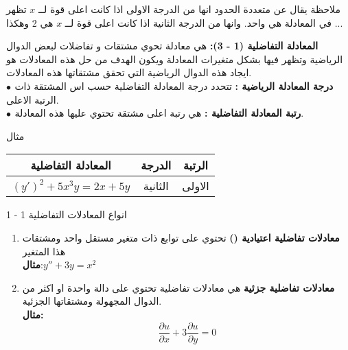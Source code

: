 	\begin{frame}
			\begin{exampleblock}{ملاحظة}
			يقال عن متعددة الحدود انها من الدرجة الاولى اذا كانت اعلى قوة لــ $x$ تظهر في المعادلة هي واحد. وانها من الدرجة الثانية اذا كانت اعلى قوة لــ $x$ هي 2 وهكذا ...
		\end{exampleblock}
		
		\begin{exampleblock}{\textbf{المعادلة التفاضلية (1 - 3):}}
			هي معادلة تحوي مشتقات و تفاضلات لبعض الدوال الرياضية وتظهر فيها بشكل متغيرات المعادلة ويكون الهدف من حل هذه المعادلات هو ايجاد هذه الدوال الرياضية التي تحقق مشتقاتها هذه المعادلات.\\
			\textbf{$\bullet$ درجة المعادلة الرياضية :}
			تتحدد درجة المعادلة التفاضلية حسب اس المشتقة ذات الرتبة الاعلى.\\
			\textbf{$\bullet$ رتبة المعادلة التفاضلية :}
			هي رتبة اعلى مشتقة تحتوي عليها هذه المعادلة.
		\end{exampleblock}
	\end{frame}
	
	\begin{frame}
		\begin{exampleblock}{مثال}
				\begin{table}[H]
				\renewcommand{\arraystretch}{1.4}
				\centering
				\begin{tabular}{|c|c|c|}
					\hline
					\textbf{المعادلة التفاضلية} & \textbf{الدرجة} & \textbf{الرتبة}\\
					\hline
					$(y')^2 + 5x^3 y = 2x + 5y$ & الثانية & الاولى\\
					\hline
				\end{tabular}
			\end{table}
		\end{exampleblock}
		
		\begin{exampleblock}{1 - 1 انواع المعادلات التفاضلية}
			\begin{enumerate}
				\item \textbf{معادلات تفاضلية اعتيادية ()} تحتوي على توابع ذات متغير مستقل واحد ومشتقات هذا المتغير \\
				\textbf{مثال}:\qquad $y'' + 3y = x^2$
				\item \textbf{معادلات تفاضلية جزئية } هي معادلات تفاضلية تحتوي على دالة واحدة او اكثر من الدوال المجهولة ومشتقاتها الجزئية.\\
				\textbf{مثال:}\[
				\frac{\partial u}{\partial x} + 3 \frac{\partial u}{\partial y} = 0
				\]
			\end{enumerate}
		\end{exampleblock}
	\end{frame}
	
